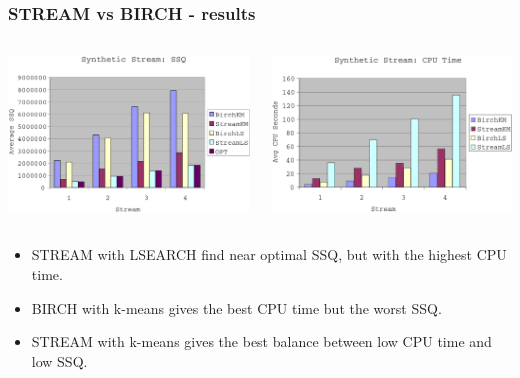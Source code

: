 \documentclass{beamer}
\begin{document}
\frame
{
  \frametitle{STREAM vs BIRCH - results}
  
  \begin{columns}
  
    \begin{column}{0.5\textwidth}
    	   \begin{center}
         \includegraphics[width=\textwidth]{figures/BIRCH_STREAM_SSQ.png}      
       \end{center}
    	  
    \end{column}
    
    \begin{column}{0.5\textwidth}
        \begin{center}
         \includegraphics[width=\textwidth]{figures/BIRCH_STREAM_CPU.png}      
        \end{center}
    \end{column}
  \end{columns}  
  
  \bigskip
  \begin{itemize}
  	\item{STREAM with LSEARCH find near optimal SSQ, but with the highest CPU time.}
  	\item{BIRCH with k-means gives the best CPU time but the worst SSQ.}
  	\item{STREAM with k-means gives the best balance between low CPU time and low SSQ. }
  \end{itemize}
   
}
\end{document}
